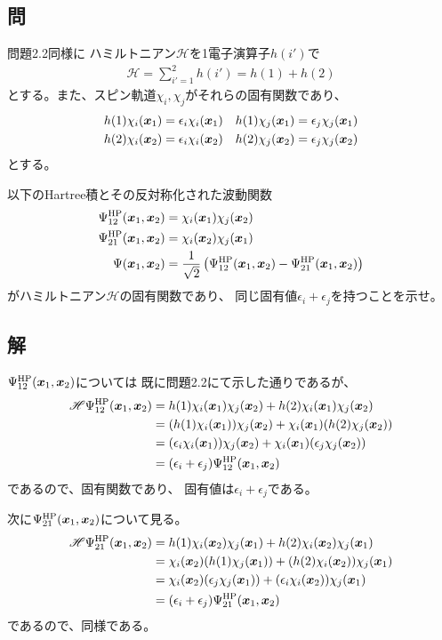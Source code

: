 \subsection{問}
問題2.2同様に
ハミルトニアン$\mathscr{H}$を1電子演算子$h(i')$で
\begin{align}
	\mathscr{H}
=
	\sum_{i'=1}^{2} h(i')
=
	h(1)
	+
	h(2)
\end{align}
とする。また、スピン軌道$\chi_i,\chi_j$がそれらの固有関数であり、
\begin{align}
	h(1) \chi_i(\x_1)
&=
	\epsilon_i \chi_i(\x_1) &
%
%
	h(1) \chi_j(\x_1)
&=
	\epsilon_j \chi_j(\x_1) \\
%
%
	h(2) \chi_i(\x_2)
&=
	\epsilon_i \chi_i(\x_2) &
%
%
	h(2) \chi_j(\x_2)
&=
	\epsilon_j \chi_j(\x_2)
\end{align}
とする。

以下のHartree積とその反対称化された波動関数
\begin{align}
	\Psi^{\rm HP}_{12}(\x_1,\x_2)
&=
	\chi_i(\x_1) \chi_j(\x_2) \\
%
%
	\Psi^{\rm HP}_{21}(\x_1,\x_2)
&=
	\chi_i(\x_2) \chi_j(\x_1) \\
%
%
	\Psi(\x_1,\x_2)
&=
	\frac{1}{\sqrt{2}}
		\left(
			\Psi^{\rm HP}_{12}(\x_1,\x_2)
			-
			\Psi^{\rm HP}_{21}(\x_1,\x_2)
		\right)
\end{align}
がハミルトニアン$\mathscr{H}$の固有関数であり、
同じ固有値$\epsilon_i+\epsilon_j$を持つことを示せ。


\subsection{解}
$\Psi^{\rm HP}_{12}({\bm{x}}_1,{\bm{x}}_2)$については
既に問題2.2にて示した通りであるが、
\begin{align}
	\mathscr{H} \Psi^{\rm HP}_{12}(\x_1,\x_2)
&=
	h(1) \chi_i(\x_1) \chi_j(\x_2)
	+
	h(2) \chi_i(\x_1) \chi_j(\x_2) \\
%
%
&=
	(h(1) \chi_i(\x_1)) \chi_j(\x_2)
	+
	\chi_i(\x_1) (h(2) \chi_j(\x_2)) \\
%
%
&=
	(\epsilon_i \chi_i(\x_1)) \chi_j(\x_2)
	+
	\chi_i(\x_1) (\epsilon_j \chi_j(\x_2)) \\
%
%
&=
	(\epsilon_i+\epsilon_j) \Psi^{\rm HP}_{12}(\x_1,\x_2)
\end{align}
であるので、固有関数であり、
固有値は$\epsilon_i+\epsilon_j$である。

次に$\Psi^{\rm HP}_{21}({\bm{x}}_1,{\bm{x}}_2)$について見る。
\begin{align}
	\mathscr{H}\Psi^{\rm HP}_{21}(\x_1,\x_2)
&=
	h(1) \chi_i(\x_2) \chi_j(\x_1)
	+
	h(2) \chi_i(\x_2) \chi_j(\x_1) \\
%
%
&=
	\chi_i(\x_2) (h(1) \chi_j(\x_1))
	+
	(h(2) \chi_i(\x_2)) \chi_j(\x_1) \\
%
%
&=
	\chi_i(\x_2) (\epsilon_j \chi_j(\x_1))
	+
	(\epsilon_i \chi_i(\x_2)) \chi_j(\x_1) \\
%
%
&=
	(\epsilon_i+\epsilon_j) \Psi^{\rm HP}_{21}(\x_1,\x_2)
\end{align}
であるので、同様である。

